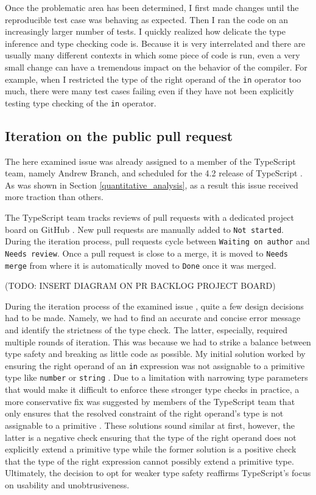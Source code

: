 \documentclass[12pt]{scrartcl}
\def\code#1{\texttt{\frenchspacing#1}}
\begin{document}
Once the problematic area has been determined, I first made changes until the reproducible test case was behaving as expected. Then I ran the code on an increasingly larger number of tests. I quickly realized how delicate the type inference and type checking code is. Because it is very interrelated and there are usually many different contexts in which some piece of code is run, even a very small change can have a tremendous impact on the behavior of the compiler. For example, when I restricted the type of the right operand of the \code{in} operator too much, there were many test cases failing even if they have not been explicitly testing type checking of the \code{in} operator.

\subsection{Iteration on the public pull request}

The here examined issue was already assigned to a member of the TypeScript team, namely Andrew Branch, and scheduled for the 4.2 release of TypeScript \cite{41317}. As was shown in Section \ref{quantitative_analysis}, as a result this issue received more traction than others.

The TypeScript team tracks reviews of pull requests with a dedicated project board on GitHub \cite{PRBacklog}. New pull requests are manually added to \code{Not started}. During the iteration process, pull requests cycle between \code{Waiting on author} and \code{Needs review}. Once a pull request is close to a merge, it is moved to \code{Needs merge} from where it is automatically moved to \code{Done} once it was merged.

(TODO: INSERT DIAGRAM ON PR BACKLOG PROJECT BOARD)

During the iteration process of the examined issue \cite{41928}, quite a few design decisions had to be made. Namely, we had to find an accurate and concise error message and identify the strictness of the type check. The latter, especially, required multiple rounds of iteration. This was because we had to strike a balance between type safety and breaking as little code as possible. My initial solution worked by ensuring the right operand of an \code{in} expression was not assignable to a primitive type like \code{number} or \code{string} \cite{41928Comment1}. Due to a limitation with narrowing type parameters \cite{13995} that would make it difficult to enforce these stronger type checks in practice, a more conservative fix was suggested by members of the TypeScript team that only ensures that the resolved constraint of the right operand's type is not assignable to a primitive \cite{41928Comment2}. These solutions sound similar at first, however, the latter is a negative check ensuring that the type of the right operand does not explicitly extend a primitive type while the former solution is a positive check that the type of the right expression cannot possibly extend a primitive type. Ultimately, the decision to opt for weaker type safety reaffirms TypeScript's focus on usability and unobtrusiveness.
\end{document}
